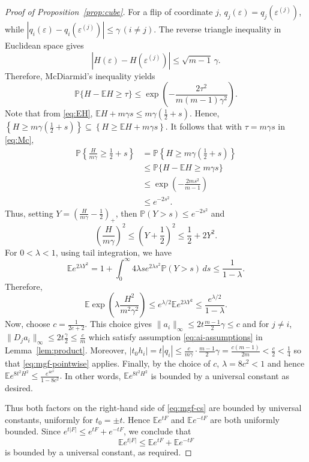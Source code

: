 \documentclass[11pt]{article}
\newcommand{\E}{\mathbb{E}}
\newcommand{\Pp}{\mathbb{P}}
\newcommand{\abs}[1]{\left\lvert #1\right\rvert}
\begin{document}
\begin{proof}[Proof of Proposition~\ref{prop:cube}]
For a flip of coordinate $j$, $q_j(\varepsilon)=q_j(\varepsilon^{(j)})$, while
$\abs{q_i(\varepsilon) - q_i(\varepsilon^{(j)})} \le \gamma
\, (i\neq j)$. The reverse triangle inequality in Euclidean space gives
\[
\abs{H(\varepsilon)-H(\varepsilon^{(j)})}
\le
\sqrt{m-1}\,\gamma.
\]
Therefore, McDiarmid's inequality yields
\begin{equation} \label{eq:Mc} 
\Pp\{H-\E H\ge \tau\} \le \exp\left( -\frac{2\tau^2}{m(m-1)\gamma^2} \right).
\end{equation}
Note that from \eqref{eq:EH}, $\E H + m\gamma s \le m\gamma \left( \frac12 + s \right)$. Hence, $ \left\{ H \ge m\gamma \left( \frac12 + s \right) \right\} \subseteq \left\{ H \ge \E H + m\gamma s \right\}$. It follows that with $\tau = m\gamma s$ in \eqref{eq:Mc},
\begin{align*}
\Pp \left\{ \frac{H}{m\gamma} \ge \frac{1}{2} + s \right\} 
& = \Pp \left\{ H \ge m\gamma\left( \frac12 + s \right) \right\} \\
& \le \Pp \{ H - \E H \ge m\gamma s \} \\
& \le \exp \left( -\frac{2ms^2}{m-1} \right) \\ 
& \le e^{-2s^2}. 
\end{align*}
Thus, setting $Y = \left( \frac{H}{m\gamma}-\frac12 \right)_+$, then $\Pp(Y>s)\le e^{-2s^2}$ and
\[
\left( \frac{H}{m\gamma} \right)^2 \le \left(Y+\frac12\right)^2 \le \frac12+2Y^2.
\]
For $0<\lambda<1$, using tail integration, we have 
\[
\E e^{2\lambda Y^2} = 1+ \int_0^\infty 4\lambda s e^{2\lambda s^2} \Pp(Y>s)\,ds
\le \frac{1}{1-\lambda}.
\]
Therefore, 
\[
\E \exp\left( \lambda\frac{H^2}{m^2\gamma^2}
\right) \le e^{\lambda/2} \E e^{2\lambda Y^2}
\le \frac{e^{\lambda/2}}{1-\lambda}.
\]
Now, choose $c = \frac{1}{2e+2}$. This choice gives $\|a_i\|_{\infty} \le 2t\frac{m-1}{2}\gamma \le c$ and for $j \neq i$, $\| D_ja_i\|_\infty \le 2t\frac{\gamma}{2} \le \frac{c}{m}$ which satisfy assumption \eqref{eq:ai-assumptions} in Lemma~\ref{lem:product}. Moreover, $\abs{t_0 h_i} = t\abs{q_i} \le \frac{c}{m\gamma}\cdot \frac{m-1}{2}\gamma = \frac{c(m-1)}{2m} < \frac{c}{2} < \frac14$ so that \eqref{eq:mgf-pointwise} applies. Finally, by the choice of $c$, $\lambda = 8c^2 < 1$ and hence $\E e^{8t^2H^2} \le \frac{e^{4c^2}}{1-8c^2}.$ In other words, $\E e^{8t^2H^2}$ is bounded by a universal constant as desired.   

Thus both factors on the right-hand side of \eqref{eq:mgf-cs} are bounded by universal constants, uniformly for $t_0=\pm t$. Hence $\E e^{tF}$ and $\E e^{-tF}$ are both uniformly bounded. Since $e^{t\abs{F}}\le e^{tF}+e^{-tF}$, we conclude that
\[
\E e^{t\abs{F}} \le \E e^{tF}+\E e^{-tF}
\]
is bounded by a universal constant, as required.
\end{proof} 
\end{document}
